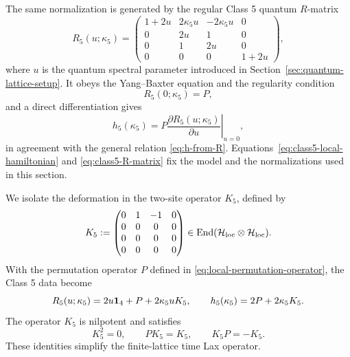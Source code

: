 The same normalization is generated by the regular Class 5 quantum
$R$-matrix
\begin{equation}
R_5(u;\kappa_5)
=
\begin{pmatrix}
1+2u&2\kappa_5 u&-2\kappa_5 u&0\\
0&2u&1&0\\
0&1&2u&0\\
0&0&0&1+2u
\end{pmatrix},
\label{eq:class5-R-matrix}
\end{equation}
where $u$ is the quantum spectral parameter introduced in
Section~\ref{sec:quantum-lattice-setup}.  It obeys the Yang--Baxter equation
and the regularity condition
\begin{equation}
R_5(0;\kappa_5)=P,
\label{eq:class5-R-regularity}
\end{equation}
and a direct differentiation gives
\begin{equation}
h_5(\kappa_5)
=
P\left.\frac{\partial R_5(u;\kappa_5)}{\partial u}\right|_{u=0},
\label{eq:class5-h-from-R}
\end{equation}
in agreement with the general relation
\eqref{eq:h-from-R}.  Equations~\eqref{eq:class5-local-hamiltonian} and
\eqref{eq:class5-R-matrix} fix the model and the normalizations used in this
section.

We isolate the deformation in the two-site operator $K_5$, defined by
\begin{equation}
K_5
:=
\begin{pmatrix}
0&1&-1&0\\
0&0&0&0\\
0&0&0&0\\
0&0&0&0
\end{pmatrix}
\in\operatorname{End}(\mathcal H_{\rm loc}\otimes\mathcal H_{\rm loc}).
\label{eq:class5-K-definition}
\end{equation}
With the permutation operator $P$ defined in
\eqref{eq:local-permutation-operator}, the Class 5 data become
\begin{equation}
R_5(u;\kappa_5)=2u\mathbf{1}_4+P+2\kappa_5 uK_5,
\qquad
h_5(\kappa_5)=2P+2\kappa_5 K_5.
\label{eq:class5-R-h-PK}
\end{equation}
The operator $K_5$ is nilpotent and satisfies
\begin{equation}
K_5^2=0,
\qquad
PK_5=K_5,
\qquad
K_5P=-K_5.
\label{eq:class5-PK-algebra}
\end{equation}
These identities simplify the finite-lattice time Lax operator.

